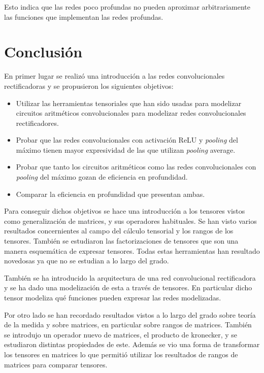 Esto indica que las redes poco profundas no pueden aproximar arbitrariamente las funciones que implementan las redes profundas.



\newpage 
\chapter{Conclusión}


En primer lugar se realizó una introducción a las redes convolucionales rectificadoras y se propusieron los siguientes objetivos:


\begin{itemize}
\item Utilizar las herramientas tensoriales que han sido usadas para modelizar circuitos aritméticos convolucionales para modelizar redes convolucionales rectificadores.

\item Probar que las redes convolucionales con activación ReLU y \textit{pooling} del máximo tienen mayor expresividad de las que utilizan \textit{pooling} average.

\item Probar que tanto los circuitos aritméticos como las redes convolucionales con \textit{pooling} del máximo gozan de eficiencia en profundidad.

\item Comparar la eficiencia en profundidad que presentan ambas.

\end{itemize} 

Para conseguir dichos objetivos se hace una introducción a los tensores vistos como generalización de matrices, y sus operadores habituales. Se han visto varios resultados concernientes al campo del cálculo tensorial y los rangos de los tensores. También se estudiaron las factorizaciones de tensores que son una manera esquemática de expresar tensores. Todas estas herramientas han resultado novedosas ya que no se estudian a lo largo del grado.

También se ha introducido la arquitectura de una red convolucional rectificadora y se ha dado una modelización de esta a través de tensores. En particular dicho tensor modeliza qué funciones pueden expresar las redes modelizadas. 

Por otro lado se han recordado resultados vistos a lo largo del grado sobre teoría de la medida y sobre matrices, en particular sobre rangos de matrices. También se introdujo un operador nuevo de matrices, el producto de kronecker, y se estudiaron distintas propiedades de este. Además se vio una forma de transformar los tensores en matrices lo que permitió utilizar los resultados de rangos de matrices para comparar tensores.

